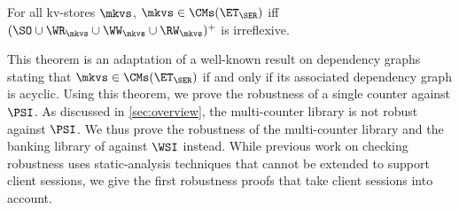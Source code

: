 \begin{theorem}
\label{thm:serialisable_nocycle}
For all kv-stores $\mkvs$, $\mkvs \in \CMs(\ET_{\SER})$ iff $(\SO \cup \WR_{\mkvs} 
\cup \WW_{\mkvs} \cup \RW_{\mkvs})^{+}$ is irreflexive.
\end{theorem}
This theorem is an adaptation of a well-known result on
dependency graphs~\cite{adya} stating that $\mkvs \in \CMs(\ET_{\SER})$ if and
only if its associated dependency graph is acyclic. 
Using this theorem, we prove the robustness of a single counter against $\PSI$.
As discussed in \cref{sec:overview}, the multi-counter library is not robust against $\PSI$. 
We thus prove the robustness of the multi-counter library and the banking library of \citet{bank-example-wsi} against $\WSI$ instead. 
While previous work on checking robustness \citep{giovanni_concur16,SIanalysis,laws,sureshConcur} uses
static-analysis techniques that cannot be extended to support client sessions, 
we give the first robustness proofs that take client sessions into account.



